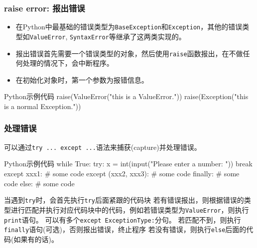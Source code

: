 \documentclass[9pt]{beamer}
\begin{document}
\begin{frame}[fragile]
    \frametitle{raise error: 报出错误}

    \begin{itemize}
        \item 在Python中最基础的错误类型为\texttt{BaseException}和\texttt{Exception}，其他的错误类型如\texttt{ValueError}, \texttt{SyntaxError}等继承了这两类实现的。
        \item 报出错误首先需要一个错误类型的对象，然后使用\texttt{raise}函数报出，在不做任何处理的情况下，会中断程序。
        \item 在初始化对象时，第一个参数为报错信息。
    \end{itemize}

\begin{codebox}{Python}{示例代码}
raise(ValueError("this is a ValueError."))
raise(Exception("this is a normal Exception."))
\end{codebox}
\end{frame}


\begin{frame}[fragile]
\frametitle{处理错误}

可以通过\texttt{try ... except ...}语法来捕获(capture)并处理错误。

\begin{codebox}{Python}{示例代码}
while True:
    try:
        x = int(input("Please enter a number: "))
        break
    except xxx1:
        # some code
    except (xxx2, xxx3):
        # some code
    finally:
        # some code
    else:
        # some code\end{codebox}
\begin{outline}
    \1 当遇到\texttt{try}时，会首先执行\texttt{try}后面紧跟的代码块
    \1 若有错误报出，则根据错误的类型进行匹配并执行对应代码块中的代码，例如若错误类型为\texttt{ValueError}，则执行\texttt{print}语句。
    \2 可以有多个\texttt{except ExceptionType:}分句。
    \2 若匹配不到，则执行\texttt{finally}语句(可选)，否则报出错误，终止程序
    \1 若没有错误，则执行\texttt{else}后面的代码(如果有的话)。
\end{outline}


\end{frame}
\end{document}
